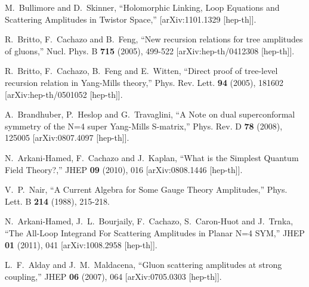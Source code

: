 \documentclass[12pt]{article}
\numberwithin{equation}{section}
\begin{document}
\begin{thebibliography}{}

M.~Bullimore and D.~Skinner,
``Holomorphic Linking, Loop Equations and Scattering Amplitudes in Twistor Space,''
[arXiv:1101.1329 [hep-th]].

R.~Britto, F.~Cachazo and B.~Feng,
``New recursion relations for tree amplitudes of gluons,''
Nucl. Phys. B \textbf{715} (2005), 499-522
[arXiv:hep-th/0412308 [hep-th]].

R.~Britto, F.~Cachazo, B.~Feng and E.~Witten,
``Direct proof of tree-level recursion relation in Yang-Mills theory,''
Phys. Rev. Lett. \textbf{94} (2005), 181602
[arXiv:hep-th/0501052 [hep-th]].

A.~Brandhuber, P.~Heslop and G.~Travaglini,
``A Note on dual superconformal symmetry of the N=4 super Yang-Mills S-matrix,''
Phys. Rev. D \textbf{78} (2008), 125005
[arXiv:0807.4097 [hep-th]].

N.~Arkani-Hamed, F.~Cachazo and J.~Kaplan,
``What is the Simplest Quantum Field Theory?,''
JHEP \textbf{09} (2010), 016
[arXiv:0808.1446 [hep-th]].

V.~P.~Nair,
``A Current Algebra for Some Gauge Theory Amplitudes,''
Phys. Lett. B \textbf{214} (1988), 215-218.

N.~Arkani-Hamed, J.~L.~Bourjaily, F.~Cachazo, S.~Caron-Huot and J.~Trnka,
``The All-Loop Integrand For Scattering Amplitudes in Planar N=4 SYM,''
JHEP \textbf{01} (2011), 041
[arXiv:1008.2958 [hep-th]].

L.~F.~Alday and J.~M.~Maldacena,
``Gluon scattering amplitudes at strong coupling,''
JHEP \textbf{06} (2007), 064
[arXiv:0705.0303 [hep-th]].


\end{thebibliography}
\end{document}
